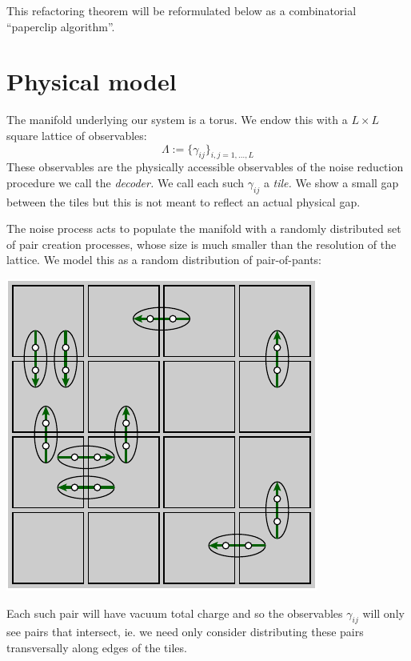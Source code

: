 \documentclass[aps, prl, letterpaper, twocolumn, superscriptaddress, notitlepage, 10pt]{revtex4-1}
\begin{document}
This refactoring theorem will be reformulated 
below as a combinatorial ``paperclip algorithm''.


%
%

\section{Physical model}

The manifold underlying our system is a torus.
We endow this with a $L\times L$ square lattice of observables:
$$
    \Lambda := \bigl\{ \gamma_{ij} \bigr\}_{i,j=1,...,L}
$$
These observables are the physically accessible observables of
the noise reduction procedure we call the \emph{decoder.}
We call each such $\gamma_{ij}$ a \emph{tile.}
We show a small gap between the tiles but this is not meant
to reflect an actual physical gap.

The noise process acts to populate the manifold with
a randomly distributed set of pair creation processes,
whose size is much smaller than the resolution of the lattice.
We model this as a random distribution of pair-of-pants:
\begin{center}
\includegraphics[]{pic-pair-create.pdf}
\end{center}

Each such pair will have vacuum total charge and so the observables
$\gamma_{ij}$ will only see pairs that intersect, ie. we
need only consider distributing these pairs
transversally along edges of the tiles.
\end{document}
